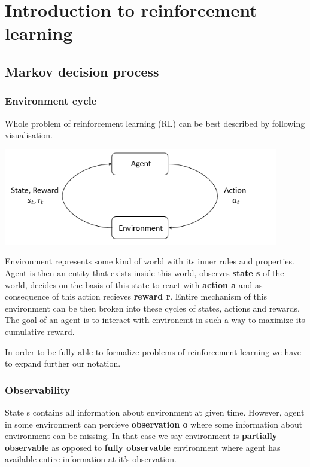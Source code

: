 \chapter{Introduction to reinforcement learning}

\section{Markov decision process}
\subsection*{Environment cycle}
Whole problem of reinforcement learning (RL) can be best described by following visualisation.

\includegraphics*[width=12cm]{rl_diagram_transparent_bg.png}

Environment represents some kind of world with its inner rules and properties. 
Agent is then an entity that exists inside this world, observes \textbf{state s} of the world, decides on the basis of this state to react with \textbf{action a} and as consequence of this action recieves \textbf{reward r}.
Entire mechanism of this environment can be then broken into these cycles of states, actions and rewards.
The goal of an agent is to interact with environemt in such a way to maximize its cumulative reward.

In order to be fully able to formalize problems of reinforcement learning we have to expand further our notation.

\subsection*{Observability}
State s contains all information about environment at given time. 
However, agent in some environment can percieve \textbf{observation o} where some information about environment can be missing.
In that case we say environment is \textbf{partially observable} as opposed to \textbf{fully observable} environment where agent has available entire information at it's observation.

